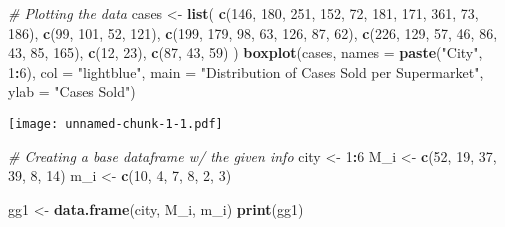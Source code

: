 \documentclass[]{article}
\newenvironment{Shaded}{\begin{snugshade}}{\end{snugshade}}
\newcommand{\AttributeTok}[1]{\textcolor[rgb]{0.13,0.29,0.53}{#1}}
\newcommand{\CommentTok}[1]{\textcolor[rgb]{0.56,0.35,0.01}{\textit{#1}}}
\newcommand{\DecValTok}[1]{\textcolor[rgb]{0.00,0.00,0.81}{#1}}
\newcommand{\FunctionTok}[1]{\textcolor[rgb]{0.13,0.29,0.53}{\textbf{#1}}}
\newcommand{\NormalTok}[1]{#1}
\newcommand{\OtherTok}[1]{\textcolor[rgb]{0.56,0.35,0.01}{#1}}
\newcommand{\SpecialCharTok}[1]{\textcolor[rgb]{0.81,0.36,0.00}{\textbf{#1}}}
\newcommand{\StringTok}[1]{\textcolor[rgb]{0.31,0.60,0.02}{#1}}
\begin{document}
\begin{Shaded}
\begin{Highlighting}[]
\CommentTok{\# Plotting the data }
\NormalTok{cases }\OtherTok{\textless{}{-}} \FunctionTok{list}\NormalTok{(}
  \FunctionTok{c}\NormalTok{(}\DecValTok{146}\NormalTok{, }\DecValTok{180}\NormalTok{, }\DecValTok{251}\NormalTok{, }\DecValTok{152}\NormalTok{, }\DecValTok{72}\NormalTok{, }\DecValTok{181}\NormalTok{, }\DecValTok{171}\NormalTok{, }\DecValTok{361}\NormalTok{, }\DecValTok{73}\NormalTok{, }\DecValTok{186}\NormalTok{),}
  \FunctionTok{c}\NormalTok{(}\DecValTok{99}\NormalTok{, }\DecValTok{101}\NormalTok{, }\DecValTok{52}\NormalTok{, }\DecValTok{121}\NormalTok{),}
  \FunctionTok{c}\NormalTok{(}\DecValTok{199}\NormalTok{, }\DecValTok{179}\NormalTok{, }\DecValTok{98}\NormalTok{, }\DecValTok{63}\NormalTok{, }\DecValTok{126}\NormalTok{, }\DecValTok{87}\NormalTok{, }\DecValTok{62}\NormalTok{),}
  \FunctionTok{c}\NormalTok{(}\DecValTok{226}\NormalTok{, }\DecValTok{129}\NormalTok{, }\DecValTok{57}\NormalTok{, }\DecValTok{46}\NormalTok{, }\DecValTok{86}\NormalTok{, }\DecValTok{43}\NormalTok{, }\DecValTok{85}\NormalTok{, }\DecValTok{165}\NormalTok{),}
  \FunctionTok{c}\NormalTok{(}\DecValTok{12}\NormalTok{, }\DecValTok{23}\NormalTok{),}
  \FunctionTok{c}\NormalTok{(}\DecValTok{87}\NormalTok{, }\DecValTok{43}\NormalTok{, }\DecValTok{59}\NormalTok{)}
\NormalTok{)}
\FunctionTok{boxplot}\NormalTok{(cases,}
        \AttributeTok{names =} \FunctionTok{paste}\NormalTok{(}\StringTok{"City"}\NormalTok{, }\DecValTok{1}\SpecialCharTok{:}\DecValTok{6}\NormalTok{),}
        \AttributeTok{col =} \StringTok{"lightblue"}\NormalTok{,}
        \AttributeTok{main =} \StringTok{"Distribution of Cases Sold per Supermarket"}\NormalTok{,}
        \AttributeTok{ylab =} \StringTok{"Cases Sold"}\NormalTok{)}
\end{Highlighting}
\end{Shaded}

\texttt{[image: unnamed-chunk-1-1.pdf]}

\begin{Shaded}
\begin{Highlighting}[]
\CommentTok{\# Creating a base dataframe w/ the given info}
\NormalTok{city }\OtherTok{\textless{}{-}} \DecValTok{1}\SpecialCharTok{:}\DecValTok{6} 
\NormalTok{M\_i }\OtherTok{\textless{}{-}} \FunctionTok{c}\NormalTok{(}\DecValTok{52}\NormalTok{, }\DecValTok{19}\NormalTok{, }\DecValTok{37}\NormalTok{, }\DecValTok{39}\NormalTok{, }\DecValTok{8}\NormalTok{, }\DecValTok{14}\NormalTok{)}
\NormalTok{m\_i }\OtherTok{\textless{}{-}} \FunctionTok{c}\NormalTok{(}\DecValTok{10}\NormalTok{, }\DecValTok{4}\NormalTok{, }\DecValTok{7}\NormalTok{, }\DecValTok{8}\NormalTok{, }\DecValTok{2}\NormalTok{, }\DecValTok{3}\NormalTok{)}

\NormalTok{gg1 }\OtherTok{\textless{}{-}} \FunctionTok{data.frame}\NormalTok{(city, M\_i, m\_i)}
\FunctionTok{print}\NormalTok{(gg1)}
\end{Highlighting}
\end{Shaded}
\end{document}
